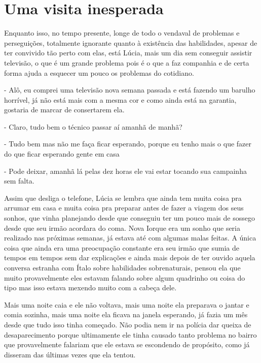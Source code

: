 
\chapter{Uma visita inesperada}


Enquanto isso, no tempo presente, longe de todo o vendaval de problemas e perseguições, totalmente ignorante quanto à existência das habilidades, apesar de ter convivido tão perto com elas, está Lúcia, mais um dia sem conseguir assistir televisão, o que é um grande problema pois é o que a faz companhia e de certa forma ajuda a esquecer um pouco os problemas do cotidiano.

- Alô, eu comprei uma televisão nova semana passada e está fazendo um barulho horrível, já não está mais com a mesma cor e como ainda está na garantia, gostaria de marcar de consertarem ela.

- Claro, tudo bem o técnico passar aí amanhã de manhã?

- Tudo bem mas não me faça ficar esperando, porque eu tenho mais o que fazer do que ficar esperando gente em casa

- Pode deixar, amanhã lá pelas dez horas ele vai estar tocando sua campainha sem falta.

Assim que desliga o telefone, Lúcia se lembra que ainda tem muita coisa pra arrumar em casa e muita coisa pra preparar antes de fazer a viagem dos seus sonhos, que vinha planejando desde que conseguiu ter um pouco mais de sossego desde que seu irmão acordara do coma. Nova Iorque era um sonho que seria realizado nas próximas semanas, já estava até com algumas malas feitas. A única coisa que ainda era uma preocupação constante era seu irmão que sumia de tempos em tempos sem dar explicações e ainda mais depois de ter ouvido aquela conversa estranha com Ítalo sobre habilidades sobrenaturais, pensou ela que muito provavelmente eles estavam falando sobre algum quadrinho ou coisa do tipo mas isso estava mexendo muito com a cabeça dele. 

Mais uma noite caia e ele não voltava, mais uma noite ela preparava o jantar e comia sozinha, mais uma noite ela ficava na janela esperando, já fazia um mês desde que tudo isso tinha começado. Não podia nem ir na polícia dar queixa de desaparecimento porque ultimamente ele tinha causado tanto problema no bairro que provavelmente falariam que ele estava se escondendo de propósito, como já disseram das últimas vezes que ela tentou.

